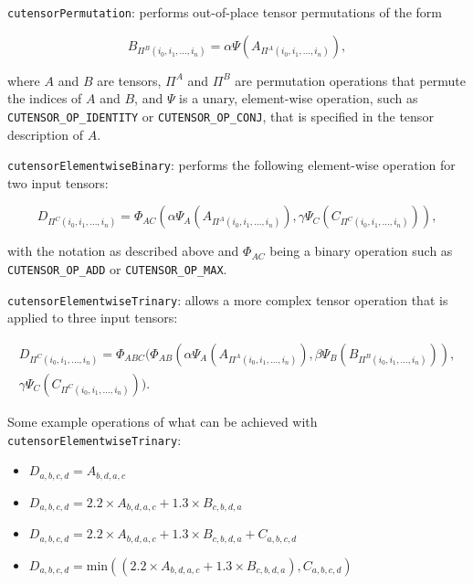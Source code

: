 \vspace{0.5em}\texttt{cutensorPermutation}: performs out-of-place tensor permutations of the form

\begin{equation*} 
B_{\Pi^B(i_0,i_1,...,i_n)} = \alpha\Psi(A_{\Pi^A(i_0,i_1,...,i_n)}),
\end{equation*}

\noindent where $A$ and $B$ are tensors, $\Pi^A$ and $\Pi^B$ are permutation operations that permute the indices of $A$ and $B$, and $\Psi$ is a unary, element-wise operation, such as \texttt{CUTENSOR\_OP\_IDENTITY} or \texttt{CUTENSOR\_OP\_CONJ}, that is specified in the tensor description of $A$.

\vspace{0.5em}\texttt{cutensorElementwiseBinary}: performs the following element-wise operation for two input tensors:

\begin{equation*}
D_{\Pi^C(i_0,i_1,...,i_n)} = \Phi_{AC}(\alpha\Psi_A(A_{\Pi^A(i_0,i_1,...,i_n)}), \gamma\Psi_C(C_{\Pi^C(i_0,i_1,...,i_n)})),
\end{equation*}

\noindent with the notation as described above and $\Phi_{AC}$ being a binary operation such as \texttt{CUTENSOR\_OP\_ADD} or \texttt{CUTENSOR\_OP\_MAX}.

\vspace{0.5em}\texttt{cutensorElementwiseTrinary}: allows a more complex tensor operation that is applied to three input tensors:

\begin{multline*}
D_{\Pi^C(i_0,i_1,...,i_n)} = \Phi_{ABC}(
  \Phi_{AB}(
    \alpha\Psi_A(A_{\Pi^A(i_0,i_1,...,i_n)}),
    \beta\Psi_B(B_{\Pi^B(i_0,i_1,...,i_n)})
  ),\\
  \gamma\Psi_C(C_{\Pi^C(i_0,i_1,...,i_n)})
).
\end{multline*}

\noindent Some example operations of what can be achieved with \texttt{cutensorElementwi\-seTrinary}:
\begin{itemize}
\item $D_{a,b,c,d} = A_{b,d,a,c}$
\item $D_{a,b,c,d} = 2.2 \times A_{b,d,a,c} + 1.3 \times B_{c,b,d,a}$
\item $D_{a,b,c,d} = 2.2 \times A_{b,d,a,c} + 1.3 \times B_{c,b,d,a} + C_{a,b,c,d}$
\item $D_{a,b,c,d} = \mathrm{min}((2.2 \times A_{b,d,a,c} + 1.3 \times B_{c,b,d,a}), C_{a,b,c,d})$
\end{itemize}

